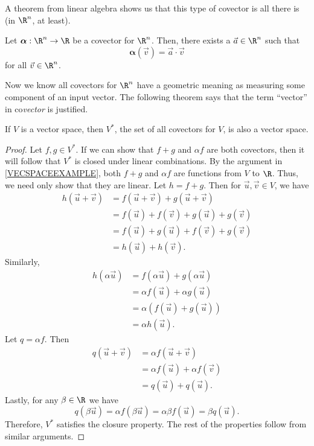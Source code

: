 A theorem from linear algebra shows us that this type of covector
is all there is (in $\R^n$, at least).

\begin{theorem}
	Let $\bm\alpha:\R^n\to \R$ be a covector for $\R^n$.  Then,
	there exists a $\vec a\in \R^n$ such that
	\[
		\bm\alpha (\vec v) = \vec a\cdot \vec v
	\]
	for all $\vec v\in\R^n$.
\end{theorem}

Now we know all covectors for $\R^n$ have a geometric meaning
as measuring some component of an input vector.  The following
theorem says that the term ``vector'' in co\emph{vector} is justified.

\begin{theorem}
	If $V$ is a vector space, then $V^*$, the set of all
	covectors for $V$, is also a vector space.
\end{theorem}
\begin{proof}
    Let $f,g\in V^*$. If we can show that $f+g$ and $\alpha f$ are both covectors, 
    then it will follow that $V^*$ is closed under linear combinations. By the
    argument in \ref{VECSPACEEXAMPLE}, both $f+g$ and $\alpha f$ are functions from
    $V$ to $\R$. Thus, we need only show that they are linear. Let $h=f+g$. Then for 
    $\vec u,\vec v\in V$, we have
    \begin{align*}
        h(\vec u+\vec v) & = f(\vec u + \vec v) + g(\vec u + \vec v) \\
                         & = f(\vec u) + f(\vec v) + g(\vec u) + g(\vec v) \\
                         & = f(\vec u) + g(\vec u) + f(\vec v) + g(\vec v) \\
                         & = h(\vec u) + h(\vec v).
    \end{align*} 
    Similarly,
    \begin{align*}
         h(\alpha\vec u) & = f(\alpha\vec u) + g(\alpha\vec u) \\
                         & = \alpha f(\vec u) + \alpha g(\vec u) \\
                         & = \alpha (f(\vec u) + g(\vec u)) \\
                         & = \alpha h(\vec u).
    \end{align*}    
    Let $q=\alpha f$. Then
    \begin{align*}
    	q(\vec u +\vec v) & = \alpha f(\vec u + \vec v) \\
                          & = \alpha f(\vec u) + \alpha f(\vec v) \\
                          & = q(\vec u) + q(\vec u).
    \end{align*} 
    Lastly, for any $\beta\in\R$ we have
    \[
        q(\beta\vec u)=\alpha f(\beta\vec u)=\alpha\beta f(\vec u) 
        =\beta q(\vec u).
    \]
    Therefore, $V^*$ satisfies the closure property. The rest of the properties 
    follow from similar arguments. 
\end{proof}

